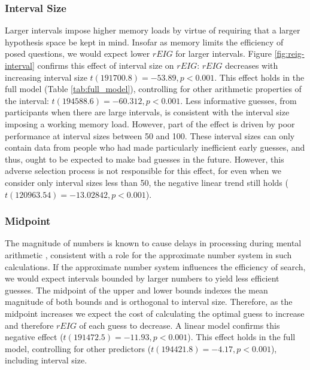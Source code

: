 \documentclass[10pt,letterpaper]{article}
\begin{document}
\subsubsection{Interval Size}
Larger intervals impose higher memory loads by virtue of requiring that a larger hypothesis space be kept in mind. Insofar as memory limits the efficiency of posed questions, we would expect lower $rEIG$ for larger intervals.
Figure \ref{fig:reig-interval} confirms this effect of interval size on $rEIG$: $rEIG$ decreases with increasing interval size $t(191700.8) = -53.89, p<0.001$. 
This effect holds in the full model (Table \ref{tab:full_model}), controlling for other arithmetic properties of the interval: $t(194588.6) = -60.312, p<0.001$. 
Less informative guesses, from participants when there are large intervals, is consistent with the interval size imposing a working memory load. However, part of the effect is driven by poor performance at interval sizes between 50 and 100. These interval sizes can only contain data from people who had made particularly inefficient early guesses, and thus, ought to be expected to make bad guesses in the future. However, this adverse selection process is not responsible for this effect, for even when we consider only interval sizes less than 50, the negative linear trend still holds ($t(120963.54)=-13.02842, p<0.001$).

\subsubsection{Midpoint}
The magnitude of numbers is known to cause delays in processing during mental arithmetic \cite{DEHAENE2003145}, consistent with a role for the approximate number system in such calculations.
If the approximate number system influences the efficiency of search, we would expect intervals bounded by larger numbers to yield less efficient guesses.  
The midpoint of the upper and lower bounds indexes the mean magnitude of both bounds and is orthogonal to interval size.
Therefore, as the midpoint increases we expect the cost of calculating the optimal guess to increase and therefore $rEIG$ of each guess to decrease. A linear model confirms this negative effect ($t(191472.5) = -11.93, p<0.001$). This effect holds in the full model, controlling for other predictors ($t(194421.8) = -4.17, p<0.001$), including interval size.
\end{document}
